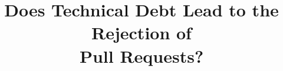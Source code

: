 \documentclass{sig-alternate}
\begin{document}
	
	\title{Does Technical Debt Lead to the Rejection of \\Pull Requests?}
	
	
\end{document}
